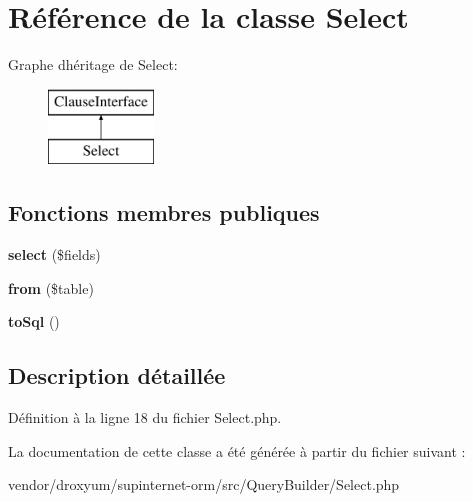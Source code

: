 \hypertarget{class_o_r_m_1_1_query_builder_1_1_select}{}\section{Référence de la classe Select}
\label{class_o_r_m_1_1_query_builder_1_1_select}
Graphe d\textquotesingle{}héritage de Select\+:\begin{figure}[H]
\begin{center}
\leavevmode
\includegraphics[height=2.000000cm]{class_o_r_m_1_1_query_builder_1_1_select}
\end{center}
\end{figure}
\subsection*{Fonctions membres publiques}
\begin{DoxyCompactItemize}
\item 
{\bfseries select} (\$fields)\hypertarget{class_o_r_m_1_1_query_builder_1_1_select_a12aabfdcd5a063324950f2f34c3ec513}{}\label{class_o_r_m_1_1_query_builder_1_1_select_a12aabfdcd5a063324950f2f34c3ec513}

\item 
{\bfseries from} (\$table)\hypertarget{class_o_r_m_1_1_query_builder_1_1_select_ac13b3019b235987db688007a12422882}{}\label{class_o_r_m_1_1_query_builder_1_1_select_ac13b3019b235987db688007a12422882}

\item 
{\bfseries to\+Sql} ()\hypertarget{class_o_r_m_1_1_query_builder_1_1_select_a63f8ba861f1ecabe359d454fde60d395}{}\label{class_o_r_m_1_1_query_builder_1_1_select_a63f8ba861f1ecabe359d454fde60d395}

\end{DoxyCompactItemize}


\subsection{Description détaillée}


Définition à la ligne 18 du fichier Select.\+php.



La documentation de cette classe a été générée à partir du fichier suivant \+:\begin{DoxyCompactItemize}
\item 
vendor/droxyum/supinternet-\/orm/src/\+Query\+Builder/Select.\+php\end{DoxyCompactItemize}
